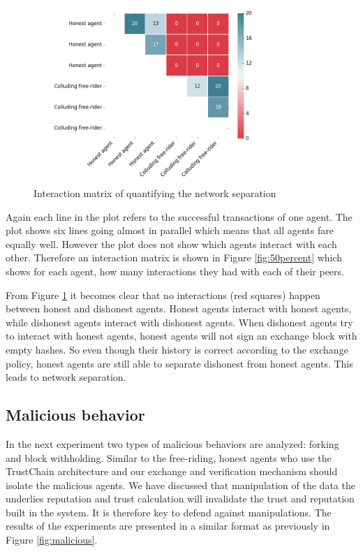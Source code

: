 \begin{figure}[h!]
    \centering
    \includegraphics[width=0.8\textwidth]{images/50percent_interaction_matrix}
    \caption{Interaction matrix of quantifying the network separation}
    \label{fig:50percent_matrix}
\end{figure}

Again each line in the plot refers to the successful transactions of one agent. The plot shows six 
lines going almost in parallel which means that all agents fare equally well. However the plot does
not show which agents interact with each other. Therefore an interaction matrix is shown in Figure 
\ref{fig:50percent} which shows for each agent, how many interactions they had with each of their 
peers. 

From Figure \ref{fig:50percent_matrix} it becomes clear that no interactions (red squares) happen 
between honest and dishonest agents. Honest agents interact with honest agents, while dishonest
agents interact with dishonest agents. When dishonest agents try to interact with honest agents, 
honest agents will not sign an exchange block with empty hashes. So even though their history is 
correct according to the exchange policy, honest agents are still able to separate dishonest from
honest agents. This leads to network separation.

\subsection{Malicious behavior}
In the next experiment two types of malicious behaviors are analyzed: forking and block withholding. 
Similar to the free-riding, honest agents who use the TrustChain architecture and our exchange and 
verification mechanism should isolate the malicious agents. We have discussed that manipulation of 
the data the underlies reputation and trust calculation will invalidate the trust and reputation 
built in the system. It is therefore key to defend against manipulations.
The results of the experiments are 
presented in a similar format as previously in Figure \ref{fig:malicious}.


